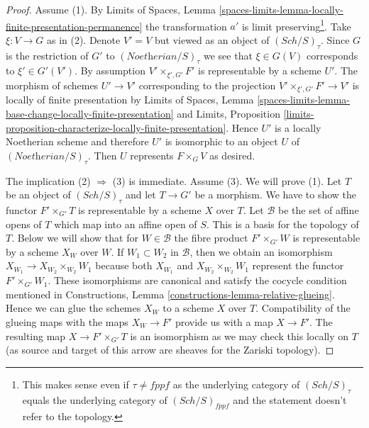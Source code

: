 \documentclass{stacks-project}
\theoremstyle{plain}
\theoremstyle{definition}
\theoremstyle{remark}
\numberwithin{equation}{subsection}
\def\Sch{\mathit{Sch}}
\begin{document}
\begin{proof}
Assume (1). By Limits of Spaces, Lemma
\ref{spaces-limits-lemma-locally-finite-presentation-permanence}
the transformation $a'$ is limit preserving\footnote{This
makes sense even if $\tau \not = fppf$ as the underlying
category of $(\Sch/S)_\tau$ equals the underlying category
of $(\Sch/S)_{fppf}$ and the statement doesn't refer to the topology.}.
Take $\xi : V \to G$ as in (2). Denote $V' = V$ but viewed as an
object of $(\Sch/S)_\tau$. Since $G$ is the restriction of
$G'$ to $(\textit{Noetherian}/S)_\tau$ we see that
$\xi \in G(V)$ corresponds to $\xi' \in G'(V')$.
By assumption $V' \times_{\xi', G'} F'$ is representable
by a scheme $U'$. The morphism of schemes $U' \to V'$ corresponding to
the projection $V' \times_{\xi', G'} F' \to V'$ is locally of finite
presentation by
Limits of Spaces, Lemma
\ref{spaces-limits-lemma-base-change-locally-finite-presentation} and
Limits, Proposition
\ref{limits-proposition-characterize-locally-finite-presentation}.
Hence $U'$ is a locally Noetherian scheme and therefore $U'$ is
isomorphic to an object $U$ of $(\textit{Noetherian}/S)_\tau$.
Then $U$ represents $F \times_G V$ as desired.

\medskip\noindent
The implication (2) $\Rightarrow$ (3) is immediate. Assume (3).
We will prove (1). Let $T$ be an object of $(\Sch/S)_\tau$
and let $T \to G'$ be a morphism. We have to show
the functor $F' \times_{G'} T$ is representable by a scheme $X$
over $T$. Let $\mathcal{B}$ be the set of affine opens of
$T$ which map into an affine open of $S$. This is a basis
for the topology of $T$. Below we will show that for $W \in \mathcal{B}$
the fibre product $F' \times_{G'} W$ is representable
by a scheme $X_W$ over $W$. If $W_1 \subset W_2$ in $\mathcal{B}$, then
we obtain an isomorphism $X_{W_1} \to X_{W_2} \times_{W_2} W_1$ because both
$X_{W_1}$ and $X_{W_2} \times_{W_2} W_1$ represent the functor
$F' \times_{G'} W_1$.
These isomorphisms are canonical and satisfy the cocycle condition
mentioned in Constructions, Lemma
\ref{constructions-lemma-relative-glueing}.
Hence we can glue the schemes $X_W$ to a scheme $X$ over $T$.
Compatibility of the glueing maps with the maps
$X_W \to F'$ provide us with a map $X \to F'$.
The resulting map $X \to F' \times_{G'} T$ is an
isomorphism as we may check this locally on $T$ (as source
and target of this arrow are sheaves for the Zariski topology).


\end{proof}
\end{document}
